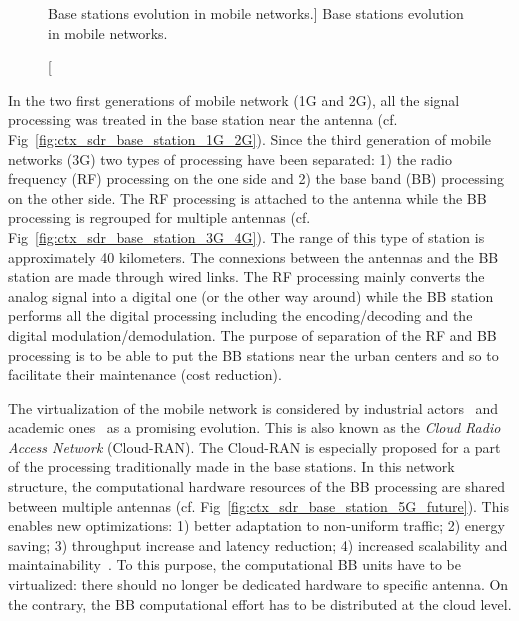 \begin{figure}[htp]
  \centering
  \quad{}
  \quad{}
  \caption
    [Base stations evolution in mobile networks.]
    {Base stations evolution in mobile networks.}
  \label{fig:ctx_sdr_base_station}
\end{figure}

In the two first generations of mobile network (1G and 2G), all the signal
processing was treated in the base station near the antenna (cf.
Fig~\ref{fig:ctx_sdr_base_station_1G_2G}). Since the third generation of mobile
networks (3G) two types of processing have been separated: 1) the radio
frequency (RF) processing on the one side and 2) the base band (BB) processing
on the other side. The RF processing is attached to the antenna while the BB
processing is regrouped for multiple antennas (cf.
Fig~\ref{fig:ctx_sdr_base_station_3G_4G}). The range of this type of station is
approximately 40 kilometers. The connexions between the antennas and the BB
station are made through wired links. The RF processing mainly converts the
analog signal into a digital one (or the other way around) while the BB station
performs all the digital processing including the encoding/decoding and the
digital modulation/demodulation. The purpose of separation of the RF and BB
processing is to be able to put the BB stations near the urban centers and so to
facilitate their maintenance (cost reduction).

The virtualization of the mobile network is considered by industrial
actors~\cite{Huawei2013,Ericsson2015} and academic ones~\cite{Wubben2014,
Rost2014,Checko2015a} as a promising evolution. This is also known as the
\emph{Cloud Radio Access Network} (Cloud-RAN). The Cloud-RAN is especially
proposed for a part of the processing traditionally made in the base stations.
In this network structure, the computational hardware resources of the BB
processing are shared between multiple antennas (cf.
Fig~\ref{fig:ctx_sdr_base_station_5G_future}). This enables new optimizations:
1) better adaptation to non-uniform traffic; 2) energy saving; 3) throughput
increase and latency reduction; 4) increased scalability and
maintainability~\cite{Checko2015a}. To this purpose, the computational BB units
have to be virtualized: there should no longer be dedicated hardware to specific
antenna. On the contrary, the BB computational effort has to be distributed at
the cloud level.

